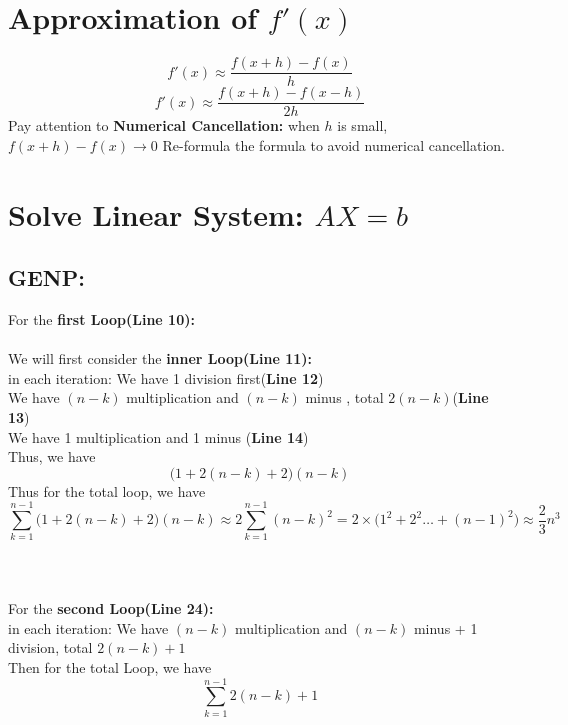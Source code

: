 \documentclass [9 pt]{article}
\theoremstyle{definition}
\begin{document}
\section*{Approximation of $f'(x)$}

$$ f'(x) \approx \dfrac{f(x + h) - f(x)}{ h } $$
$$ f'(x) \approx \dfrac{f(x + h) - f(x - h)}{ 2h } $$
\newline
\newline
\newline
Pay attention to \textbf{Numerical Cancellation:}
when $h$ is small, $f(x + h) - f(x) \to 0$
Re-formula the formula to avoid numerical cancellation.

\newpage
\section*{Solve Linear System: $AX = b$}
\subsection*{GENP:}


For the \textbf{first Loop(Line 10):}\\\\
We will first consider the  \textbf{inner Loop(Line 11):}\\
in each iteration:
We have 1 division first\quad (\textbf{Line 12})\\
We have $(n - k)$ multiplication and $(n - k)$ minus , total $ 2(n -k)  $\quad  (\textbf{Line 13}) \\
We have 1 multiplication and 1 minus \quad (\textbf{Line 14})\\
Thus, we have 
$$\big(1 + 2(n -k) + 2\big)(n - k)  $$
Thus for the total loop, we have
$$ \sum_{k = 1}^{n - 1}\big(1 + 2(n -k) + 2\big)(n - k) \approx 2\sum_{k = 1}^{n - 1}(n - k)^2 = 2 \times \bigg(1^2 + 2^2 \ldots + (n-1)^2 \bigg) \approx \dfrac{2}{3} n^3   $$
\\
\\
\\
For the \textbf{second Loop(Line 24):}\\
in each iteration:
We have $(n - k)$ multiplication and $(n - k)$ minus + 1 division, total $ 2(n -k) + 1 $\\
Then for the total Loop, we have 
$$\sum_{k = 1}^{n - 1} 2(n -k) + 1  $$
\end{document}
